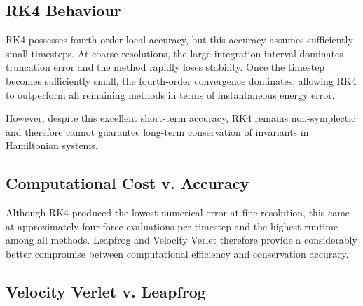 \subsection{RK4 Behaviour}

RK4 possesses fourth-order local accuracy, but this accuracy assumes sufficiently small timesteps.
At coarse resolutions, the large integration interval dominates truncation error and the method rapidly
loses stability. Once the timestep becomes sufficiently small, the fourth-order convergence dominates,
allowing RK4 to outperform all remaining methods in terms of instantaneous energy error.

However, despite this excellent short-term accuracy, RK4 remains non-symplectic and therefore cannot guarantee
long-term conservation of invariants in Hamiltonian systems.

\subsection{Computational Cost v. Accuracy}

Although RK4 produced the lowest numerical error at fine resolution, this came at approximately four force evaluations
per timestep and the highest runtime among all methods.
Leapfrog and Velocity Verlet therefore provide a considerably better compromise between computational efficiency and
conservation accuracy.

\subsection{Velocity Verlet v. Leapfrog}

